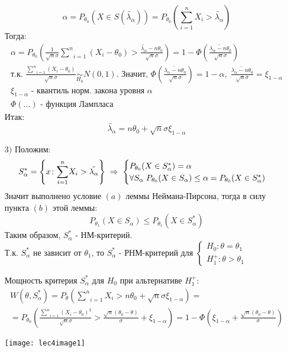\begin{Proof}
\begin{itemize}
		$$\alpha = P_{\theta_0} (X \in S(\tilde{\lambda_{\alpha}})) = P_{\theta_0}(\underset{i=1}{\overset{n}{\sum}}X_i > \tilde{\lambda_{\alpha}})$$
		Тогда:
		$$\begin{gathered}
			\alpha = P_{\theta_0} (\frac{1}{\sqrt{n}\sigma} \underset{i=1}{\overset{n}{\sum}}(X_i - \theta_0) > \frac{\tilde{\lambda_{\alpha}} - n \theta_0}{\sqrt{n}\sigma}) = 1 - \Phi (\frac{\tilde{\lambda_{\alpha} - n \theta_0}}{\sqrt{n}\sigma}) \\
			\text{т.к.  } \frac{\underset{i=1}{\overset{n}{\sum}}(X_i - \theta_0)}{\sqrt{n}\sigma} \underset{H_0}{\sim} N(0,1) \text{. Значит, } \Phi (\frac{\tilde{\lambda_{\alpha} - n \theta_0}}{\sqrt{n}\sigma}) = 1-\alpha, \; \frac{\tilde{\lambda_{\alpha} - n \theta_0}}{\sqrt{n}\sigma} = \xi_{1-\alpha}\\
			\xi_{1-\alpha} \text{ - квантиль норм. закона уровня } \alpha\\
			\Phi (\dots) \text{ - функция Лампласа}
		\end{gathered}$$
		Итак:
		$$\tilde{\lambda_{\alpha}} = n \theta_0 + \sqrt{n} \sigma \xi_{1-\alpha}$$
		\item[$3)$] Положим:
		$$S_{\alpha}^{*} = \left\{x\colon\underset{i=1}{\overset{n}{\sum}}X_i > \tilde{\lambda_{\alpha}}\right\} \; \Rightarrow \; \begin{cases}
			P_{\theta_0} (X \in S_{\alpha}^{*}) = \alpha \\
			\forall S_{\alpha} \; P_{\theta_0} (X \in S_{\alpha}) \le \alpha = P_{\theta_0} (X \in S_{\alpha}^{*})
		\end{cases}$$ 
		Значит выполнено условие $(a)$ леммы Неймана-Пирсона, тогда в силу пункта $(b)$ этой леммы:
		$$P_{\theta_1} (X \in S_{\alpha}) \le P_{\theta_1} (X \in S_{\alpha}^{*})$$
		Таким образом, $S_{\alpha}^{*}$ - НМ-критерий.\\
		Т.к. $S_{\alpha}^{*}$ не зависит от $\theta_1$, то $S_{\alpha}^{*}$ - РНМ-критерий для $\begin{cases}
			H_0: \theta = \theta_1 \\
			H_1^{+}: \theta > \theta_1
		\end{cases}$

		Мощность критерия $S_{\alpha}^{*}$ для $H_0$ при альтернативе $H_1^{+}$:
		$$\begin{gathered}
			W(\theta, S_{\alpha}^{*}) = P_{\theta} (\underset{i=1}{\overset{n}{\sum}}X_i > n \theta_0 + \sqrt{n} \sigma \xi_{1-\alpha}) = \\
			= P_{\theta_0} \left( \frac{\underset{i=1}{\overset{n}{\sum}}(X_i - \theta_0)^2}{\sqrt{n} \sigma} > \frac{\sqrt{n} (\theta_0 - \theta)}{\sigma} + \xi_{1-\alpha} \right) = 1 - \Phi (\xi_{1-\alpha} + \frac{\sqrt{n} (\theta_0 - \theta)}{\sigma})
		\end{gathered}$$
		\begin{center}
			\texttt{[image: lec4image1]}
		\end{center}
	\end{itemize}
\end{Proof}


